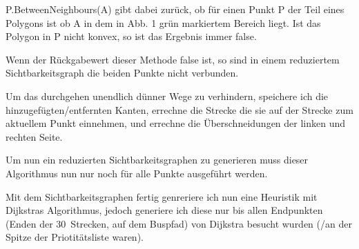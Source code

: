 \documentclass[12pt]{article}
\begin{document}
\begin{minipage}{0.6\textwidth}
P.BetweenNeighbours(A) gibt dabei zurück, ob für einen Punkt P der Teil eines Polygons ist ob A in dem in Abb. 1 grün markiertem Bereich liegt. Ist das Polygon in P nicht konvex, so ist das Ergebnis immer false.

Wenn der Rückgabewert dieser Methode false ist, so sind in einem reduziertem Sichtbarkeitsgraph die beiden Punkte nicht verbunden.
\end{minipage}\hspace{0.5cm}
\begin{minipage}{0.35\textwidth}
\end{minipage}

Um das durchgehen unendlich dünner Wege zu verhindern, speichere ich die hinzugefügten/entfernten Kanten, errechne die Strecke die sie auf der Strecke zum aktuellem Punkt einnehmen, und errechne die Überschneidungen der linken und rechten Seite.

Um nun ein reduzierten Sichtbarkeitsgraphen zu generieren muss dieser Algorithmus nun nur noch für alle Punkte ausgeführt werden.

Mit dem Sichtbarkeitsgraphen fertig genreriere ich nun eine Heuristik mit Dijkstras Algorithmus, jedoch generiere ich diese nur bis allen Endpunkten (Enden der 30\degree\ Strecken, auf dem Buspfad) von Dijkstra besucht wurden (/an der Spitze der Priotitätsliste waren).
\end{document}
